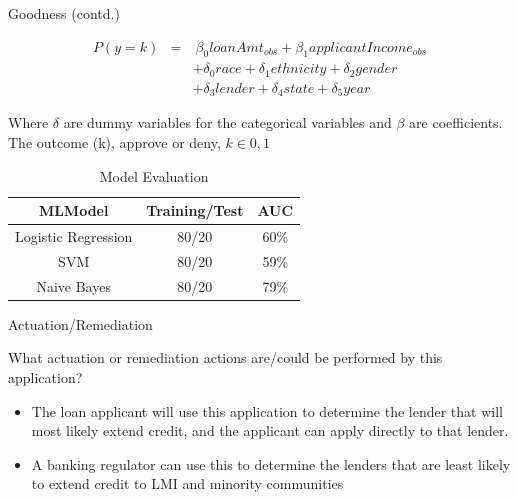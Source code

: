 \documentclass{beamer}
\begin{document}
\begin{frame}{Goodness (contd.)}

\begin{eqnarray*}
P(y=k) & = & \ \beta_0 loanAmt_{obs}  + \beta_1 applicantIncome_{obs} \\
& & + \delta_0 race + \delta_1 ethnicity  + \delta_2 gender  \\
& & + \delta_3 lender  +  \delta_4 state + \delta_5 year
\end{eqnarray*}

Where $\delta$ are dummy variables for the categorical variables and $\beta$ are coefficients. The outcome (k), approve or deny, $k \in 0,1$

\begin{table}[]
\begin{tabular}{|c|c|c|}
\hline
\textbf{MLModel}    & \textbf{Training/Test} & \textbf{AUC} \\ \hline
Logistic Regression & 80/20                  & 60\%         \\ \hline
SVM                 & 80/20                  & 59\%         \\ \hline
Naive Bayes         & 80/20                  & 79\%         \\ \hline
\end{tabular}
\caption{Model Evaluation}
\label{tab:my-table}
\end{table}



\end{frame}

\begin{frame}{Actuation/Remediation}

What actuation or remediation actions are/could be performed by this application?  \vspace{3mm}

\begin{itemize}
  \item The loan applicant will use this application to determine the lender that will most likely extend credit, and the applicant can apply directly to that lender. 
  \item A banking regulator can use this to determine the lenders that are least likely to extend credit to LMI and minority communities 
\end{itemize}


\end{frame}
\end{document}
